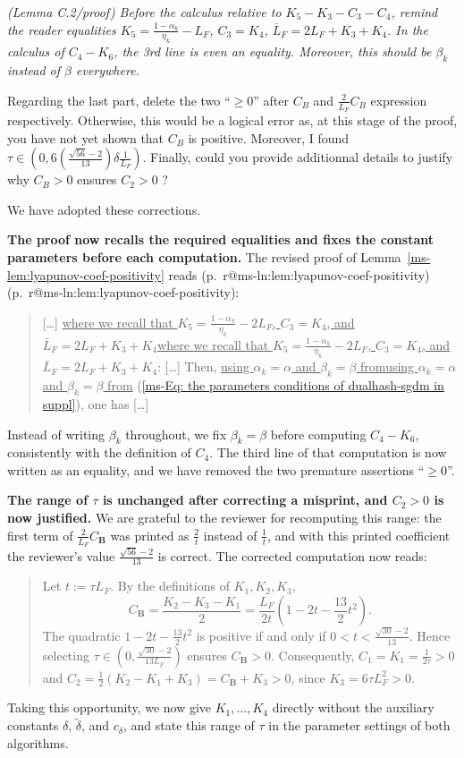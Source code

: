 \documentclass[11pt]{article}
\makeatletter
\newcommand{\mref}[1]{\ref*{ms-#1}}
\newcommand{\mpage}[1]{\pageref*{ms-#1}}
\newcommand{\meq}[1]{(\mref{#1})}
\newcommand{\mhasline}[1]{\ifcsname r@ms-ln:#1\endcsname\expandafter\@firstoftwo\else\expandafter\@secondoftwo\fi}
\newcommand{\mline}[1]{\getrefnumber{ms-ln:#1}}
\newcommand{\mpl}[1]{p.~\mpage{#1}\mhasline{#1}{, line~\mline{#1}}{}}
\newcommand{\bB}{\bm{B}}
\newcommand{\blue}[1]{{\ifmmode\color{blue}#1\else\normalfont\upshape\color{blue}#1\fi}}
\newenvironment{bluequote}{\begin{quote}\normalfont\upshape\color{blue}}{\end{quote}}
\newcommand{\newred}[1]{{\color{red}#1}}
\newcommand{\mk}[1]{\ifmmode\underline{#1}\else\uline{#1}\fi}
\let\reviewitem\item
\newenvironment{qalist}{\begin{description}[leftmargin=0pt,labelindent=0pt,itemsep=0.8em,parsep=0.5em,font=\normalfont\upshape\bfseries]}{\end{description}}
\makeatother
\begin{document}
\begin{qalist}
\item[{Q77.}] {\itshape (Lemma C.2/proof) Before the calculus relative to $K_5-K_3-C_3-C_4$, remind the reader equalities $K_5=\frac{1-\alpha_k}{\eta_k}-L_F$, $C_3=K_4$, $\overline{L}_F=2L_F+K_3+K_4$. In the calculus of $C_4-K_6$, the 3rd line is even an equality. Moreover, this should be $\beta_k$ instead of $\beta$ everywhere.
\par Regarding the last part, delete the two ``$\ge 0$'' after $C_B$ and $\frac{2}{L_F}C_B$ expression respectively. Otherwise, this would be a logical error as, at this stage of the proof, you have not yet shown that $C_B$ is positive. Moreover, I found $\tau\in\left(0,6\left(\frac{\sqrt{56}-2}{13}\right)\delta\frac{1}{L_F}\right)$. Finally, could you provide additionnal details to justify why $C_B>0$ ensures $C_2>0$ ?}
\item[Response:] \newred{We} have adopted these corrections.
\begin{enumerate}[label={[\roman*]},before=\let\item\reviewitem]
\item \textbf{The proof now recalls the required equalities and fixes the constant parameters before each computation.} The revised proof of Lemma~\mref{lem:lyapunov-coef-positivity} reads \blue{(\mpl{lem:lyapunov-coef-positivity})}:
\begin{bluequote}
[\ldots] \mk{where we recall that $K_{5}=\frac{1-\alpha_{k}}{\eta_{k}}-2L_{F}$, $C_{3}=K_{4}$, and $\bar{L}_{F}=2L_{F}+K_{3}+K_{4}$}: [\ldots] Then, \mk{using $\alpha_{k}=\alpha$ and $\beta_{k}=\beta$ from} \meq{Eq: the parameters conditions of dualhash-sgdm in suppl}, one has [\ldots]
\end{bluequote}
Instead of writing $\beta_k$ throughout, we fix $\beta_k=\beta$ before computing $C_4-K_6$, consistently with the definition of $C_4$. The third line of that computation is now written as an equality, and we have removed the two premature assertions ``$\ge 0$''.
\item \textbf{The range of $\tau$ is unchanged after correcting a misprint, and $C_2>0$ is now justified.} We are grateful to the reviewer for recomputing this range: the first term of $\frac{2}{L_F}C_{\bB}$ was printed as $\frac{2}{t}$ instead of $\frac{1}{t}$, and with this printed coefficient the reviewer's value $\frac{\sqrt{56}-2}{13}$ is correct. The corrected computation now reads:
\begin{bluequote}
Let $t:=\tau L_F$. By the definitions of $K_1,K_2,K_3$,
\[
C_{\bB}=\frac{K_2-K_3-K_1}{2}=\frac{L_F}{2t}\left(1-2t-\frac{13}{2}t^2\right).
\]
The quadratic $1-2t-\frac{13}{2}t^{2}$ is positive if and only if $0<t<\frac{\sqrt{30}-2}{13}$. Hence selecting $\tau\in\left(0,\frac{\sqrt{30}-2}{13L_{F}}\right)$ ensures $C_{\bB}>0$. Consequently, $C_1=K_1=\frac{1}{2\tau}>0$ and $C_2=\frac{1}{2}(K_2-K_1+K_3)=C_{\bB}+K_3>0$, since $K_3=6\tau L_F^2>0$.
\end{bluequote}
Taking this opportunity, we now give $K_1,\ldots,K_4$ directly without the auxiliary constants $\delta$, $\tilde\delta$, and $c_\delta$, and state this range of $\tau$ in the parameter settings of both algorithms.
\end{enumerate}


\end{qalist}
\end{document}
